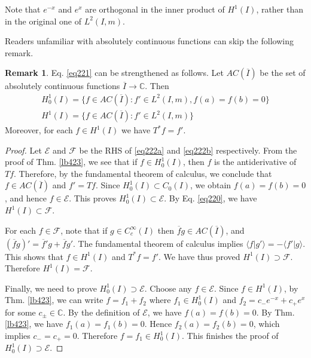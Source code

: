 \documentclass[12pt,b5paper,notitlepage]{article}
\theoremstyle{definition}
\newtheorem{rem}[df]{Remark}
\theoremstyle{plain}
\newcommand{\mc}{\mathcal}
\newcommand{\ovl}{\overline}
\newcommand{\bk}[1]{\langle {#1}\rangle}
\newcommand{\Cbb}{\mathbb C}
\numberwithin{equation}{section}
\begin{document}
Note that $e^{-x}$ and $e^x$ are orthogonal in the inner product of $H^1(I)$, rather than in the original one of $L^2(I,m)$.

Readers unfamiliar with absolutely continuous functions can skip the following remark.


\begin{rem}
Eq. \ref{eq221} can be strengthened as follows. Let $AC(\ovl I)$ be the set of absolutely continuous functions $\ovl I\rightarrow\Cbb$. Then
\begin{subequations}\label{eq222}
\begin{gather}
H^1_0(I)=\{f\in AC(\ovl I):f'\in L^2(I,m),f(a)=f(b)=0\}\label{eq222a}\\
H^1(I)=\{f\in AC(\ovl I):f'\in L^2(I,m)\}\label{eq222b}
\end{gather} 
\end{subequations}
Moreover, for each $f\in H^1(I)$ we have $T^*f=f'$.
\end{rem}

\begin{proof}
Let $\mc E$ and $\mc F$ be the RHS of \eqref{eq222a} and \eqref{eq222b} respectively. From the proof of Thm. \ref{lb423}, we see that if $f\in H^1_0(I)$, then $f$ is the antiderivative of $Tf$. Therefore, by the fundamental theorem of calculus, we conclude that $f\in AC(\ovl I)$ and $f'=Tf$. Since $H^1_0(I)\subset C_0(I)$, we obtain $f(a)=f(b)=0$, and hence $f\in\mc E$. This proves $H^1_0(I)\subset\mc E$. By Eq. \eqref{eq220}, we have $H^1(I)\subset\mc F$.

For each $f\in\mc F$, note that if $g\in C_c^\infty(I)$ then $\ovl fg\in AC(\ovl I)$, and $(\ovl fg)'=\ovl f'g+\ovl fg'$. The fundamental theorem of calculus implies $\bk{f|g'}=-\bk{f'|g}$. This shows that $f\in H^1(I)$ and $T^*f=f'$. We have thus proved $H^1(I)\supset \mc F$. Therefore $H^1(I)=\mc F$.

Finally, we need to prove $H^1_0(I)\supset\mc E$. Choose any $f\in\mc E$. Since $f\in H^1(I)$, by Thm. \ref{lb423}, we can write $f=f_1+f_2$ where $f_1\in H^1_0(I)$ and $f_2=c_-e^{-x}+c_+e^x$ for some $c_\pm\in\Cbb$. By the definition of $\mc E$, we have $f(a)=f(b)=0$. By Thm. \ref{lb423}, we have $f_1(a)=f_1(b)=0$. Hence $f_2(a)=f_2(b)=0$, which implies $c_-=c_+=0$. Therefore $f=f_1\in H^1_0(I)$. This finishes the proof of $H^1_0(I)\supset\mc E$.
\end{proof}
\end{document}
